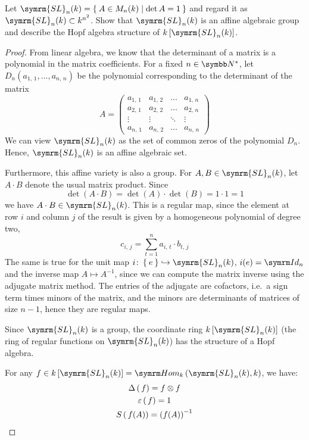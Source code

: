 \begin{exercise}
Let \(\symrm{SL}_n (k) = \Set{ A \in M_n(k) | \det A = 1 }\) and regard it as \(\symrm{SL}_n (k) \subset k^{n^2}\). Show that \(\symrm{SL}_n (k)\) is an affine algebraic group and describe the Hopf algebra structure of \(k\left[\symrm{SL}_n (k)\right]\).
\end{exercise}
\begin{proof}
From linear algebra, we know that the determinant of a matrix is a polynomial in the matrix coefficients. For a fixed \(n \in \naturals^*\), let \(D_n \left(a_{1, \, 1}, \dots, a_{n, \, n}\right)\) be the polynomial corresponding to the determinant of the matrix
\[
    A = \begin{pmatrix}
        a_{1, \, 1} & a_{1, \, 2} & \hdots & a_{1, \, n} \\
        a_{2, \, 1} & a_{2, \, 2} & \hdots & a_{2, \, n} \\
        \vdots & \vdots & \ddots & \vdots \\
        a_{n, \, 1} & a_{n, \, 2} & \dots & a_{n, \, n}
    \end{pmatrix}
\]
We can view \(\symrm{SL}_n (k)\) as the set of common zeros of the polynomial \(D_n\). Hence, \(\symrm{SL}_n (k)\) is an affine algebraic set.

Furthermore, this affine variety is also a group. For \(A, B \in \symrm{SL}_n (k)\), let \(A \cdot B\) denote the usual matrix product. Since
\[
    \det(A \cdot B) = \det(A) \cdot \det(B) = 1 \cdot 1 = 1
\]
we have \(A \cdot B \in \symrm{SL}_n (k)\). This is a regular map, since the element at row \(i\) and column \(j\) of the result is given by a homogeneous polynomial of degree two,
\[
    c_{i, \, j} = \sum_{t = 1}^{n} a_{i, \, t} \cdot b_{t, \, j}
\]
The same is true for the unit map \(i \colon \Set{e} \hookrightarrow \symrm{SL}_n (k)\), \(i(e) = \Id_n\) and the inverse map \(A \mapsto A^{-1}\), since we can compute the matrix inverse using the adjugate matrix method. The entries of the adjugate are cofactors, i.e.\ a sign term times minors of the matrix, and the minors are determinants of matrices of size \(n - 1\), hence they are regular maps.

Since \(\symrm{SL}_n (k)\) is a group, the coordinate ring \(k\left[\symrm{SL}_n (k)\right]\) (the ring of regular functions on \(\symrm{SL}_n (k)\)) has the structure of a Hopf algebra.

For any \(f \in k\left[\symrm{SL}_n (k)\right] = \Hom_k \left(\symrm{SL}_n (k), k\right)\), we have:
\begin{gather*}
    \Delta\left(\, f\right) = f \otimes f \\
    \varepsilon\left(\, f\right) = 1 \\
    S\left(\, f(A)\right) = \left(f(A)\right)^{-1}
\end{gather*}
\end{proof}

